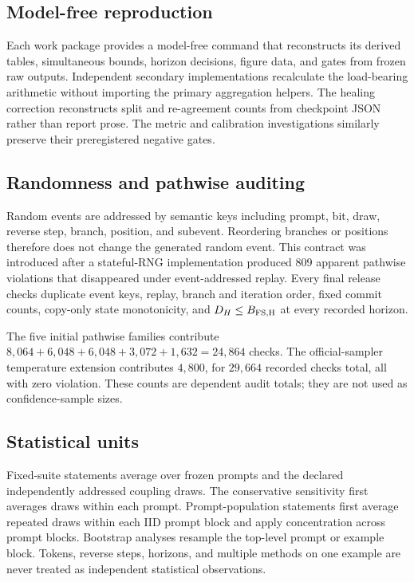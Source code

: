 \subsection{Model-free reproduction}
Each work package provides a model-free command that reconstructs its derived tables, simultaneous bounds, horizon decisions, figure data, and gates from frozen raw outputs. Independent secondary implementations recalculate the load-bearing arithmetic without importing the primary aggregation helpers. The healing correction reconstructs split and re-agreement counts from checkpoint JSON rather than report prose. The metric and calibration investigations similarly preserve their preregistered negative gates.

\subsection{Randomness and pathwise auditing}
Random events are addressed by semantic keys including prompt, bit, draw, reverse step, branch, position, and subevent. Reordering branches or positions therefore does not change the generated random event. This contract was introduced after a stateful-RNG implementation produced 809 apparent pathwise violations that disappeared under event-addressed replay. Every final release checks duplicate event keys, replay, branch and iteration order, fixed commit counts, copy-only state monotonicity, and $D_H\le B_{\rm FS,H}$ at every recorded horizon.

The five initial pathwise families contribute
$8{,}064+6{,}048+6{,}048+3{,}072+1{,}632=24{,}864$ checks. The official-sampler temperature extension contributes $4{,}800$, for $29{,}664$ recorded checks total, all with zero violation. These counts are dependent audit totals; they are not used as confidence-sample sizes.

\subsection{Statistical units}
Fixed-suite statements average over frozen prompts and the declared independently addressed coupling draws. The conservative sensitivity first averages draws within each prompt. Prompt-population statements first average repeated draws within each IID prompt block and apply concentration across prompt blocks. Bootstrap analyses resample the top-level prompt or example block. Tokens, reverse steps, horizons, and multiple methods on one example are never treated as independent statistical observations.


